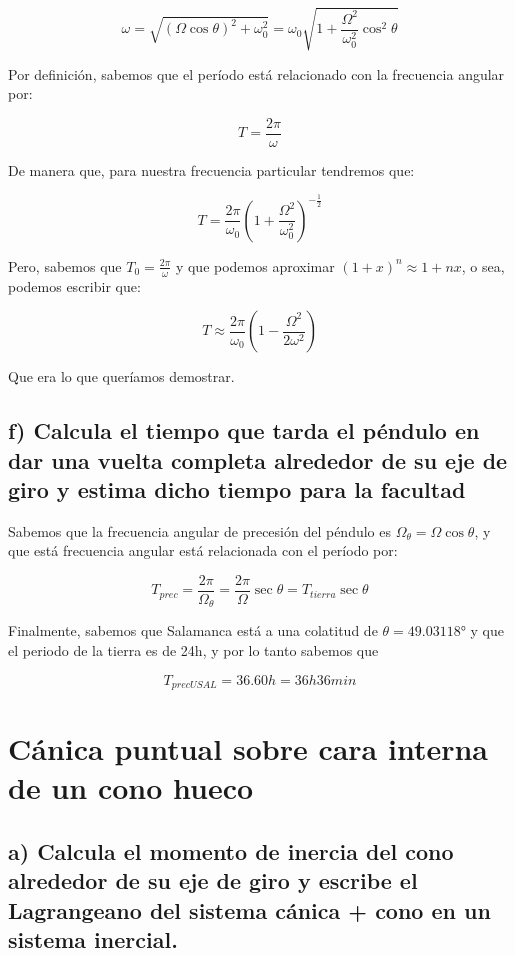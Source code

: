 \documentclass[a4paper,12pt]{article}
\begin{document}
$$\omega =\sqrt{(\Omega\cos\theta)^2 + \omega_0^2} = \omega_0 \sqrt{1 + \frac{\Omega^2}{\omega_0^2} \cos^2\theta} $$

Por definición, sabemos que el período está relacionado con la frecuencia angular por:

$$T = \frac{2\pi}{ \omega}$$

De manera que, para nuestra frecuencia particular tendremos que:

$$T = \frac{2\pi}{\omega_0} \left(1 + \frac{\Omega^2}{\omega_0^2}\right)^{-\frac{1}{2}}$$

Pero, sabemos que $T_{0} =\frac{2\pi}{\omega} $ y que podemos aproximar $(1+x)^{n} \approx1+nx$, o sea, podemos escribir que:

\begin{equation}
  T \approx \frac{2\pi}{\omega_0} \left(1 - \frac{\Omega^2}{2\omega^2}\right)
\end{equation}

Que era lo que queríamos demostrar.

\subsection*{f) Calcula el tiempo que tarda el péndulo en dar una vuelta completa alrededor de su eje de giro y estima dicho tiempo para la facultad}

Sabemos que la frecuencia angular de precesión del péndulo es $\Omega_{\theta} = \Omega \cos\theta$, y que está frecuencia angular está relacionada con el período por:

$$T_{prec} = \frac{2\pi}{\Omega_\theta} = \frac{2\pi}{\Omega} \sec\theta = T_{tierra} \sec\theta $$

Finalmente, sabemos que Salamanca está a una colatitud de $\theta = 49.03118°$ y que el periodo de la tierra es de 24h, y por lo tanto sabemos que

$$T_{precUSAL} = 36.60 h = 36h 36 min$$

\section{ Cánica puntual sobre cara interna de un cono hueco}

\subsection*{a) Calcula el momento de inercia del cono alrededor de su eje de giro y escribe el Lagrangeano del sistema cánica + cono en un sistema inercial.}
\end{document}
